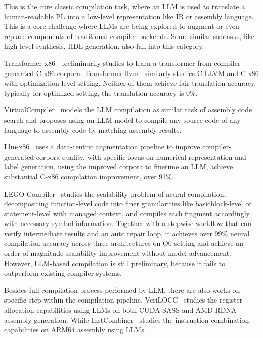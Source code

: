 \documentclass[pdflatex,sn-mathphys-ay,twocolumn, a4paper]{sn-jnl}%
\theoremstyle{thmstyleone}%
\theoremstyle{thmstyletwo}%
\theoremstyle{thmstylethree}%
\begin{document}
This is the core classic compilation task, where an LLM is used to translate a human-readable PL into a low-level representation like IR or assembly language. This is a core challenge where LLMs are being explored to augment or even replace components of traditional compiler backends. Some similar subtasks, like high-level synthesis, HDL generation, also fall into this category.

Transformer-x86~\citep{39_armengol-estape2021learning} preliminarily studies to learn a transformer from compiler-generated C-x86 corpora.
Transformer-llvm~\citep{171_guo2022enabling} similarly studies C-LLVM and C-x86 with optimization level setting. Neither of them achieve fair translation accuracy, typically for optimized setting, the translation accuracy is 0\%.

VirtualCompiler~\citep{71_gao-etal-2024-virtual} models the LLM compilation as similar task of assembly code search and proposes using an LLM model to compile any source code of any language to assembly code by matching assembly results.

Llm-x86~\citep{70_c-x86-emnlp24} uses a data-centric augmentation pipeline to improve compiler-generated corpora quality, with specific focus on numerical representation and label generation, using the improved corpora to finetune an LLM, achieve substantial C-x86 compilation improvement, over 91\%.

LEGO-Compiler~\citep{5_legocompiler-arxiv25} studies the scalability problem of neural compilation, decompositing function-level code into finer granularities like basicblock-level or statement-level with managed context, and compiles each fragment accordingly with necessary symbol information. Together with a stepwise workflow that can verify intermediate results and an auto repair loop, it achieves over 99\% neural compilation accuracy across three architectures on O0 setting and achieve an order of magnitude scalability improvement without model advancement.
However, LLM-based compilation is still preliminary, because it fails to outperform existing compiler systems.

Besides full compilation process performed by LLM, there are also works on specific step within the compilation pipeline. VeriLOCC~\citep{85_jin2025verilocc} studies the register allocation capabilities using LLMs on both CUDA SASS and AMD RDNA assembly generation. While InstCombiner~\citep{152_mannarswamy2022learningcombineinstructionsllvm} studies the instruction combination capabilities on ARM64 assembly using LLMs.
\end{document}
